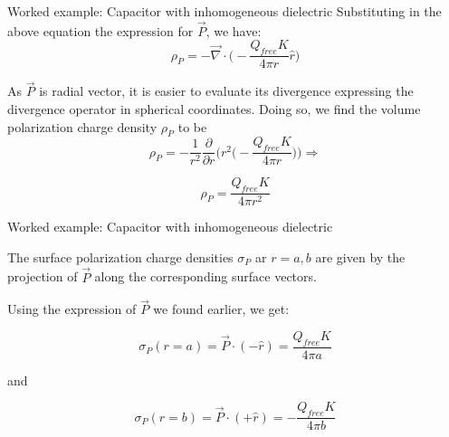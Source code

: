 {\begin{frame}{Worked example: Capacitor with inhomogeneous dielectric}
  Substituting in the above equation the expression for $\vec{P}$, we have:
  \begin{equation*}
     \rho_{P} = - \vec{\nabla} \cdot \Big( - \frac{Q_{free}K}{4\pi r} \hat{r} \Big)
  \end{equation*}

  As $\vec{P}$ is radial vector, it is easier to evaluate its divergence
  expressing the divergence operator in spherical coordinates.
  Doing so, we find the volume polarization charge density $\rho_{P}$ to be
  \begin{equation*}
     \rho_{P} = - \frac{1}{r^2} \frac{\partial}{\partial r}
                  \Bigg(r^2
                    \Big( - \frac{Q_{free}K}{4\pi r} \Big)
                  \Bigg) \Rightarrow
  \end{equation*}

  \begin{equation*}
     \rho_{P} = \frac{Q_{free}K}{4\pi r^2}
  \end{equation*}

\end{frame}
%
%
%

\begin{frame}{Worked example: Capacitor with inhomogeneous dielectric}

  The surface polarization charge densities $\sigma_{P}$
  ar $r=a,b$ are given by the projection of $\vec{P}$
  along the corresponding surface vectors.

  Using the expression of $\vec{P}$ we found earlier, we get:

  \begin{equation*}
     \sigma_{P}(r=a) = \vec{P} \cdot (-\hat{r}) = \frac{Q_{free}K}{4\pi a}
  \end{equation*}

  and

  \begin{equation*}
     \sigma_{P}(r=b) = \vec{P} \cdot (+\hat{r}) = - \frac{Q_{free}K}{4\pi b}
  \end{equation*}

\end{frame}


} %


%
%

